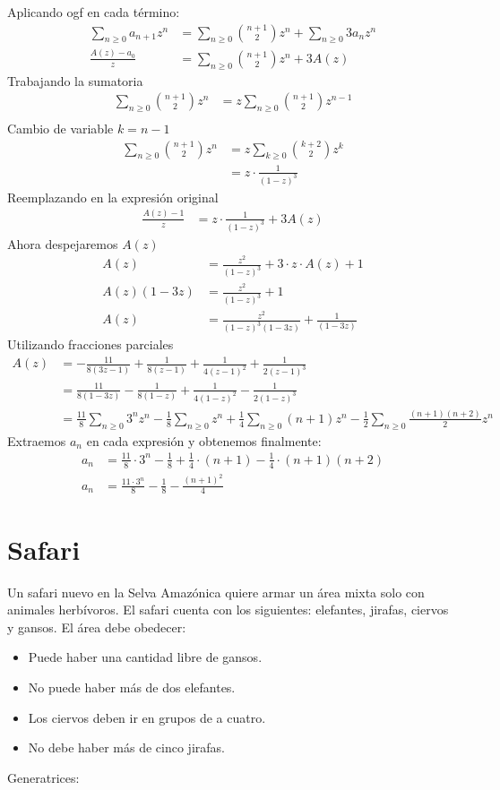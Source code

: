 \documentclass[spanish, fleqn]{article}
\begin{document}
	Aplicando ogf en cada término:
	\begin{align*}
	\sum_{n \geqslant 0} a_{n+1}z^n &= \sum_{n \geqslant 0} \binom{n+1}{2}z^n +\sum_{n \geqslant 0} 3a_{n}z^n \\
	\frac{A(z)- a_{0}}{z} &= \sum_{n \geqslant 0} \binom{n+1}{2}z^n + 3A(z)
	\end{align*}
	Trabajando la sumatoria		
	\begin{align*}
	\sum_{n \geqslant 0} \binom{n+1}{2}z^n &= z\sum_{n \geqslant 0} \binom{n+1}{2}z^{n-1}\\
	\end{align*}
	Cambio de variable $k = n-1$
	\begin{align*}	
	\sum_{n \geqslant 0} \binom{n+1}{2}z^n&=z\sum_{k \geqslant 0} \binom{k+2}{2}z^k\\  
	&=z \cdot \frac{1}{(1-z)^3}
	\end{align*}
	Reemplazando en la expresión original
	\begin{align*}
	\frac{A(z)- 1}{z} &=z \cdot \frac{1}{(1-z)^3} + 3A(z)
	\end{align*}
	Ahora despejaremos $A(z)$
	\begin{align*}
	A(z) &=\frac{z^2}{(1-z)^3} + 3\cdot z\cdot A(z)+ 1\\
	A(z) (1-3z)&=\frac{z^2}{(1-z)^3}  +1\\
	A(z)&=\frac{z^2}{(1-z)^3(1-3z)} +  \frac{1}{(1-3z)}
	\end{align*}
	Utilizando fracciones parciales
	\begin{align*}
	A(z)&= -\frac{11}{8(3z-1)}+ \frac{1}{8(z-1)}+\frac{1}{4(z-1)^2}+\frac{1}{2(z-1)^3}\\
	&= \frac{11}{8(1-3z)}- \frac{1}{8(1-z)}+\frac{1}{4(1-z)^2}-\frac{1}{2(1-z)^3}\\
	&= \frac{11}{8}\sum_{n \geqslant 0} 3^n z^n -\frac{1}{8}\sum_{n \geqslant 0} z^n + \frac{1}{4} \sum_{n \geqslant 0} (n+1)z^n-\frac{1}{2} \sum_{n \geqslant 0} \frac{(n+1)(n+2)}{2}z^n
	\end{align*}
	Extraemos $a_n$ en cada expresión y obtenemos finalmente:
	\begin{align*}
	a_n &= \frac{11}{8} \cdot 3^n-\frac{1}{8}+\frac{1}{4} \cdot (n+1)-\frac{1}{4} \cdot (n+1)(n+2)\\
	a_n &= \frac{11 \cdot 3^n}{8} - \frac{1}{8}-\frac{(n+1)^2}{4}
	\end{align*}
	\section{Safari}
	Un safari nuevo en la Selva Amazónica quiere armar un área mixta solo con animales herbívoros. El safari cuenta con los siguientes: elefantes, jirafas, ciervos y gansos. El área debe obedecer:
    \begin{itemize}
    \item Puede haber una cantidad libre de gansos.
    \item No puede haber más de dos elefantes.
    \item Los ciervos deben ir en grupos de a cuatro.
    \item No debe haber más de cinco jirafas.
    \end{itemize}
    Generatrices:
    
\end{document}
